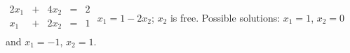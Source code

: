 {$\begin{array}{ccccc}
2x_1&+&4x_2&=&2\\
x_1&+&2x_2&=&1\\
\end{array}$}
{$x_1=1-2x_2$; $x_2$ is free. Possible solutions: $x_1=1$, $x_2=0$ and $x_1=-1$, $x_2=1$.}